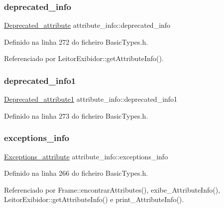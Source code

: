 \subsubsection{\texorpdfstring{deprecated\+\_\+info}{deprecated\_info}}
{\footnotesize\ttfamily \hyperlink{structDeprecated__attribute}{Deprecated\+\_\+attribute} attribute\+\_\+info\+::deprecated\+\_\+info}



Definido na linha 272 do ficheiro Basic\+Types.\+h.



Referenciado por Leitor\+Exibidor\+::get\+Attribute\+Info().

\mbox{\label{structattribute__info_a5de1a193a4c37b0432092f204322dc46}} 
\subsubsection{\texorpdfstring{deprecated\+\_\+info1}{deprecated\_info1}}
{\footnotesize\ttfamily \hyperlink{structDeprecated__attribute1}{Deprecated\+\_\+attribute1} attribute\+\_\+info\+::deprecated\+\_\+info1}



Definido na linha 273 do ficheiro Basic\+Types.\+h.

\mbox{\label{structattribute__info_a244c271949354ebd402f9330cb02b062}} 
\subsubsection{\texorpdfstring{exceptions\+\_\+info}{exceptions\_info}}
{\footnotesize\ttfamily \hyperlink{structExceptions__attribute}{Exceptions\+\_\+attribute} attribute\+\_\+info\+::exceptions\+\_\+info}



Definido na linha 266 do ficheiro Basic\+Types.\+h.



Referenciado por Frame\+::encontrar\+Attributes(), exibe\+\_\+\+Attribute\+Info(), Leitor\+Exibidor\+::get\+Attribute\+Info() e print\+\_\+\+Attribute\+Info().

